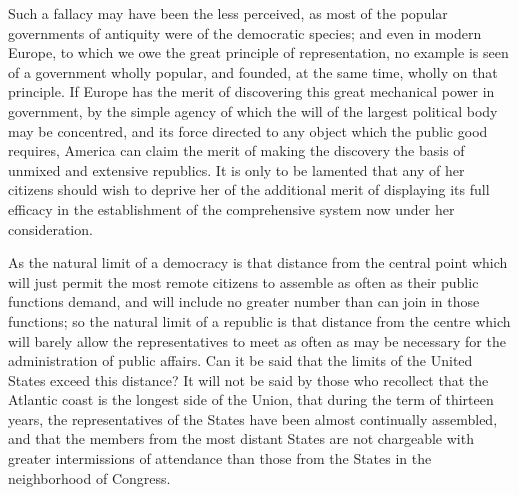 Such a fallacy may have been the less perceived, as most of the popular governments of antiquity were of the democratic species; and even in modern Europe, to which we owe the great principle of representation, no example is seen of a government wholly popular, and founded, at the same time, wholly on that principle. If Europe has the merit of discovering this great mechanical power in government, by the simple agency of which the will of the largest political body may be concentred, and its force directed to any object which the public good requires, America can claim the merit of making the discovery the basis of unmixed and extensive republics. It is only to be lamented that any of her citizens should wish to deprive her of the additional merit of displaying its full efficacy in the establishment of the comprehensive system now under her consideration.

As the natural limit of a democracy is that distance from the central point which will just permit the most remote citizens to assemble as often as their public functions demand, and will include no greater number than can join in those functions; so the natural limit of a republic is that distance from the centre which will barely allow the representatives to meet as often as may be necessary for the administration of public affairs. Can it be said that the limits of the United States exceed this distance? It will not be said by those who recollect that the Atlantic coast is the longest side of the Union, that during the term of thirteen years, the representatives of the States have been almost continually assembled, and that the members from the most distant States are not chargeable with greater intermissions of attendance than those from the States in the neighborhood of Congress.

